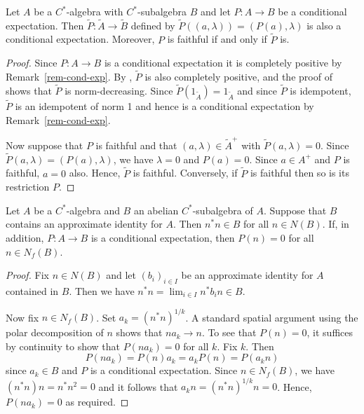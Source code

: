 \documentclass[12pt,a4paper]{amsart}
\begin{document}
\begin{lemma}\label{lem:expectation extends}
Let $A$ be a $C^*$-algebra with $C^*$-subalgebra $B$ and let
$P:A\to B$ be a conditional expectation.  Then $\widetilde
P:\widetilde A\to\widetilde B$ defined by $\widetilde
P((a,\lambda))=(P(a),\lambda)$ is also a conditional
expectation. Moreover, $P$ is faithful if and only if
$\widetilde P$ is.
\end{lemma}
\begin{proof}
Since $P:A\to B$ is a conditional expectation it is completely
positive by Remark~\ref{rem-cond-exp}. By
\cite[Lemma~3.9]{choi-effros}, $\widetilde P$ is also
completely positive, and the proof of
\cite[Lemma~3.9]{choi-effros} shows that $\widetilde P$ is
norm-decreasing. Since $\widetilde P(1_{\widetilde{A}}) =
1_{\widetilde{A}}$ and since $\widetilde P$ is idempotent, $\widetilde P$ is an idempotent of norm 1 and
hence is a conditional expectation by
Remark~\ref{rem-cond-exp}.

Now suppose that $P$ is faithful and that $(a,\lambda) \in
\widetilde{A}^+$ with $\widetilde P(a,\lambda)=0$. Since
$\widetilde P(a,\lambda) = (P(a), \lambda)$, we have $\lambda =
0$ and $P(a) = 0$.  Since $a \in A^+$ and $P$ is faithful, $a =
0$ also.  Hence, $\widetilde P$ is faithful. Conversely, if
$\widetilde P$ is faithful then so is its restriction $P$.
\end{proof}


\begin{lemma}\label{lem:exp kills normalisers}
Let $A$ be a $C^*$-algebra and $B$  an abelian $C^*$-subalgebra
of $A$.  Suppose that $B$ contains an approximate identity for
$A$. Then $n^*n \in B$ for all $n \in N(B)$. If, in addition,
$P : A \to B$ is a conditional expectation, then $P(n) = 0$
for all $n \in N_f(B)$.
\end{lemma}
\begin{proof}
Fix $n \in N(B)$ and let  $(b_i)_{i \in I}$ be an approximate
identity for $A$ contained in $B$.   Then we have $n^*n =
\lim_{i \in I} n^* b_i n \in B$.

Now fix $n \in N_f(B)$. Set $a_k = (n^*n)^{1/k}$. A standard
spatial argument using the polar decomposition of $n$ shows that
$na_k \to n$. To see that $P(n)=0$, it suffices by continuity to
show that $P(na_k) = 0$ for all $k$. Fix $k$. Then
\[
P(na_k) = P(n)a_k = a_kP(n) = P(a_kn)
\]
since  $a_k \in B$ and $P$ is a conditional expectation. Since
$n \in N_f(B)$, we have $(n^*n) n = n^* n^2 = 0$ and it follows
that $a_kn = (n^*n)^{1/k} n = 0$. Hence, $P(na_k) = 0$ as
required.
\end{proof}
\end{document}
